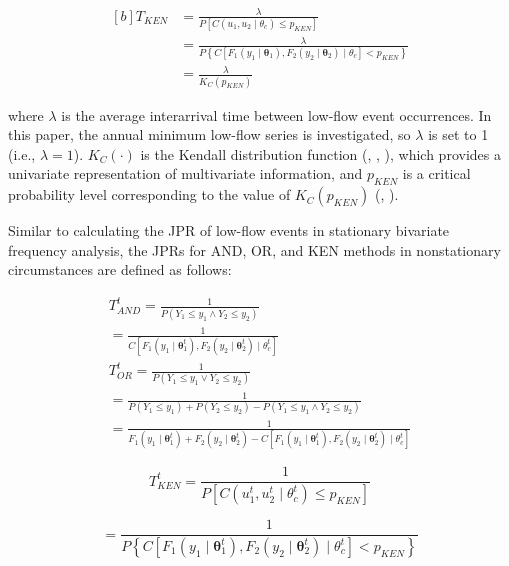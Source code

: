 \documentclass[
]{krantz}
\begin{document}
\[
\begin{aligned}[b]
T_{KEN} &= \frac{\lambda}{P\left[C\left(u_{1}, u_{2} \mid \theta_{c}\right) \leq p_{KEN}\right]} \\
&= \frac{\lambda}{P\left\{C\left[F_{1}\left(y_{1} \mid \boldsymbol{\theta}_{1}\right), F_{2}\left(y_{2} \mid \boldsymbol{\theta}_{2}\right) \mid \theta_{c}\right] < p_{KEN}\right\}}  \\
&= \frac{\lambda}{K_{C}\left(p_{KEN}\right)}
\end{aligned}\tag{23}
\]

where \(\lambda\) is the average interarrival time between low-flow event occurrences. In this paper, the annual minimum low-flow series is investigated, so \(\lambda\) is set to 1 (i.e., \(\lambda = 1\)). \(K_{C}(\cdot)\) is the Kendall distribution function (\citet{Genest1993}, \citet{Barbe1996}, \citet{Salvadori2007}), which provides a univariate representation of multivariate information, and \(p_{KEN}\) is a critical probability level corresponding to the value of \(K_{C}(p_{KEN})\) (\citet{Salvadori2011}, \citet{Salvadori2013}).

Similar to calculating the JPR of low-flow events in stationary bivariate frequency analysis, the JPRs for AND, OR, and KEN methods in nonstationary circumstances are defined as follows:

\[
\begin{aligned}
T_{A N D}^{t}=\frac{1}{P\left(Y_{1} \leq y_{1} \wedge Y_{2} \leq y_{2}\right)}\\
=\frac{1}{C\left[F_{1}\left(y_{1} \mid \boldsymbol{\theta}_{1}^{t}\right), F_{2}\left(y_{2} \mid \boldsymbol{\theta}_{2}^{t}\right) \mid \theta_{c}^{t}\right]} \\
T_{O R}^{t}=\frac{1}{P\left(Y_{1} \leq y_{1} \vee Y_{2} \leq y_{2}\right)} \\
=\frac{1}{P\left(Y_{1} \leq y_{1}\right)+P\left(Y_{2} \leq y_{2}\right)-P\left(Y_{1} \leq y_{1} \wedge Y_{2} \leq y_{2}\right)} \\
=\frac{1}{F_{1}\left(y_{1} \mid \boldsymbol{\theta}_{1}^{t}\right)+F_{2}\left(y_{2} \mid \boldsymbol{\theta}_{2}^{t}\right)-C\left[F_{1}\left(y_{1} \mid \boldsymbol{\theta}_{1}^{t}\right), F_{2}\left(y_{2} \mid \boldsymbol{\theta}_{2}^{t}\right) \mid \theta_{c}^{t}\right]} 
\end{aligned}\tag{24}
\]

\[
T_{K E N}^{t}=\frac{1}{P\left[C\left(u_{1}^{t}, u_{2}^{t} \mid \theta_{c}^{t}\right) \leq p_{K E N}\right]}
\]

\[
=\frac{1}{P\left\{C\left[F_{1}\left(y_{1} \mid \boldsymbol{\theta}_{1}^{t}\right), F_{2}\left(y_{2} \mid \boldsymbol{\theta}_{2}^{t}\right) \mid \theta_{c}^{t}\right]<p_{K E N}\right\}} \tag{25}
\]
\end{document}
